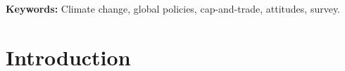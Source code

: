 \textbf{Keywords:} Climate change, global policies, cap-and-trade, attitudes, survey.%

\tableofcontents

\onehalfspacing %


\section{Introduction}%


